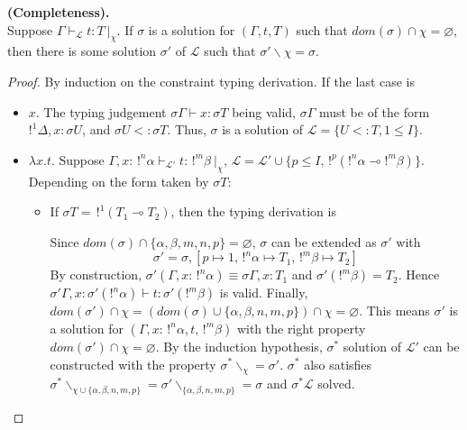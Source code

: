 \begin{prop}{\bf (Completeness).} \\
	Suppose $\Gamma \vdash_\mathcal{L} t : T ~|_\chi$. If $\sigma$ is a solution for $(\Gamma, t, T)$ such that
	$dom(\sigma) \cap \chi = \varnothing$, then there 	is some solution $\sigma'$ of $\mathcal{L}$ such that
	$\sigma' \backslash \chi = \sigma$.
	
	\begin{proof}
		By induction on the constraint typing derivation. If the last case is
		\begin{itemize}
		\item $x$. The typing judgement $\sigma \Gamma \vdash x : \sigma T$ being valid, $\sigma \Gamma$ must be of the form
			$!^1 \Delta, x : \sigma U$, and $\sigma U <: \sigma T$. Thus, $\sigma$ is a solution of $\mathcal{L} = \{ U <: T, 1 \le I \}$.
			
		\item $\lambda x.t$. Suppose $\Gamma, x : \,!^n\alpha \vdash_\mathcal{L'} t : \,!^m\beta ~|_\chi$, $\mathcal{L} = \mathcal{L'} \cup
			\{ p \le I, \,!^p(!^n\alpha \multimap !^m\beta) \}$.
			Depending on the form taken by $\sigma T$:
			\begin{itemize}
			\item If $\sigma T = \,!^1 (T_1 \multimap T_2)$, then the typing derivation is
				\begin{prooftree}
				\end{prooftree}
				Since $dom(\sigma) \cap \{\alpha, \beta, m, n, p\} = \varnothing$, $\sigma$ can be extended as $\sigma'$ with
					$$\sigma' = \sigma, [p \mapsto 1, \,!^n\alpha \mapsto T_1, \,!^m\beta \mapsto T_2]$$
				By construction, $\sigma' (\Gamma, x : \,!^n\alpha) \equiv \sigma\Gamma, x : T_1$ and $\sigma' (!^m \beta) = T_2$. Hence
				$\sigma' \Gamma, x : \sigma'(!^n\alpha) \vdash t : \sigma'(!^m \beta)$ is valid. Finally,
				$dom(\sigma') \cap \chi = (dom(\sigma) \cup \{\alpha, \beta, n, m, p\}) \cap \chi = \varnothing$.
				This means $\sigma'$ is a solution for $(\Gamma,x : \,!^n\alpha, t, \,!^m\beta)$ with the right property
				$dom(\sigma') \cap \chi = \varnothing$. By the induction hypothesis, $\sigma^*$ solution of $\mathcal{L'}$ can be constructed
				with the property $\sigma^* \backslash_\chi = \sigma'$.
				$\sigma^*$ also satisfies $\sigma^*\backslash_{\chi \cup \{\alpha, \beta, n, m , p\}} =
				\sigma' \backslash_{\{\alpha, \beta, n, m, p \}} = \sigma$ and $\sigma^* \mathcal{L}$ solved. \\
					

\end{itemize}
\end{itemize}
\end{proof}
\end{prop}
